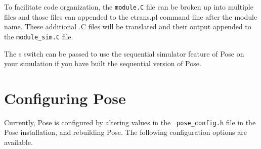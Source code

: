 \documentclass[10pt]{article}
\newcommand{\pose}{{\sc Pose}}
\begin{document}
To facilitate code organization, the {\tt module.C} file can be broken up into multiple files and those files can appended to the {etrans.pl} command line after the module name.  These additional .C files will be translated and their output appended to the {\tt module\_sim.C} file.  

The \-s switch can be passed to use the sequential simulator feature of \pose{} on your simulation if you have built the sequential version of \pose{}.

\section{Configuring \pose{}}

Currently, \pose{} is configured by altering values in the {\tt
pose\_config.h} file in the \pose{} installation, and rebuilding
\pose{}.  The following configuration options are available.
\end{document}
